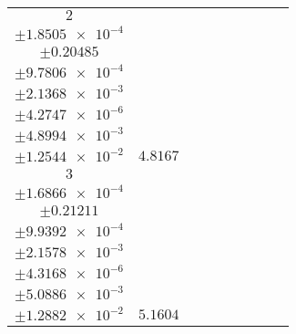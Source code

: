 \documentclass[8pt]{article}
\begin{document}
\begin{longtable}[l]{c c c c c c c c c}
$\num{2}$ & \begin{tabular}[c]{@{}c@{}}$\num{6.1963e-2}$ \\ $\pm\num{1.8505e-4}$\end{tabular} & \begin{tabular}[c]{@{}c@{}}$\num{-1.7661}$ \\ $\pm\num{0.20485}$\end{tabular} & \begin{tabular}[c]{@{}c@{}}$\num{-3.4434}$ \\ $\pm\num{9.7806e-4}$\end{tabular} & \begin{tabular}[c]{@{}c@{}}$\num{4.0416e+3}$ \\ $\pm\num{2.1368e-3}$\end{tabular} & \begin{tabular}[c]{@{}c@{}}$\num{8.0854}$ \\ $\pm\num{4.2747e-6}$\end{tabular} & \begin{tabular}[c]{@{}c@{}}$\num{1.6556}$ \\ $\pm\num{4.8994e-3}$\end{tabular} & \begin{tabular}[c]{@{}c@{}}$\num{4.4352}$ \\ $\pm\num{1.2544e-2}$\end{tabular} & $\num{4.8167}$\\
$\num{3}$ & \begin{tabular}[c]{@{}c@{}}$\num{6.7289e-2}$ \\ $\pm\num{1.6866e-4}$\end{tabular} & \begin{tabular}[c]{@{}c@{}}$\num{3.1831}$ \\ $\pm\num{0.21211}$\end{tabular} & \begin{tabular}[c]{@{}c@{}}$\num{3.4443}$ \\ $\pm\num{9.9392e-4}$\end{tabular} & \begin{tabular}[c]{@{}c@{}}$\num{4.0484e+3}$ \\ $\pm\num{2.1578e-3}$\end{tabular} & \begin{tabular}[c]{@{}c@{}}$\num{8.0991}$ \\ $\pm\num{4.3168e-6}$\end{tabular} & \begin{tabular}[c]{@{}c@{}}$\num{1.7508}$ \\ $\pm\num{5.0886e-3}$\end{tabular} & \begin{tabular}[c]{@{}c@{}}$\num{4.5932}$ \\ $\pm\num{1.2882e-2}$\end{tabular} & $\num{5.1604}$\\

\end{longtable}
\end{document}
